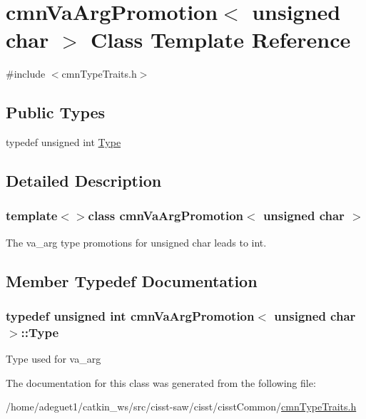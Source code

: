 \hypertarget{classcmn_va_arg_promotion_3_01unsigned_01char_01_4}{\section{cmn\-Va\-Arg\-Promotion$<$ unsigned char $>$ Class Template Reference}
\label{classcmn_va_arg_promotion_3_01unsigned_01char_01_4}
}


{\ttfamily \#include $<$cmn\-Type\-Traits.\-h$>$}

\subsection*{Public Types}
\begin{DoxyCompactItemize}
\item 
typedef unsigned int \hyperlink{classcmn_va_arg_promotion_3_01unsigned_01char_01_4_a48aa7cdbc964dd0fd51f202aa5fa02bf}{Type}
\end{DoxyCompactItemize}


\subsection{Detailed Description}
\subsubsection*{template$<$$>$class cmn\-Va\-Arg\-Promotion$<$ unsigned char $>$}

The va\-\_\-arg type promotions for unsigned char leads to int. 

\subsection{Member Typedef Documentation}
\hypertarget{classcmn_va_arg_promotion_3_01unsigned_01char_01_4_a48aa7cdbc964dd0fd51f202aa5fa02bf}{
\subsubsection[{Type}]{\setlength{\rightskip}{0pt plus 5cm}typedef unsigned int {\bf cmn\-Va\-Arg\-Promotion}$<$ unsigned char $>$\-::{\bf Type}}}\label{classcmn_va_arg_promotion_3_01unsigned_01char_01_4_a48aa7cdbc964dd0fd51f202aa5fa02bf}
Type used for va\-\_\-arg 

The documentation for this class was generated from the following file\-:\begin{DoxyCompactItemize}
\item 
/home/adeguet1/catkin\-\_\-ws/src/cisst-\/saw/cisst/cisst\-Common/\hyperlink{cmn_type_traits_8h}{cmn\-Type\-Traits.\-h}\end{DoxyCompactItemize}

